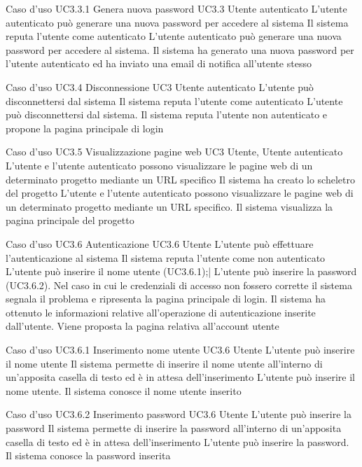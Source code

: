 \UCtitle
{Caso d'uso UC3.3.1}
{Genera nuova password}
\UC
{UC3.3}
{Utente autenticato}
{L'utente autenticato può generare una nuova password per accedere al sistema}
{Il sistema reputa l'utente come autenticato}
\scenario
{L'utente autenticato può generare una nuova password per accedere al sistema.}
\post
{Il sistema ha generato una nuova password per l'utente autenticato ed ha inviato una email di notifica all'utente stesso}

\UCtitle
{Caso d'uso UC3.4}
{Disconnessione}
\UC
{UC3}
{Utente autenticato}
{L'utente può disconnettersi dal sistema}
{Il sistema reputa l'utente come autenticato}
\scenario
{L'utente può disconnettersi dal sistema.}
\post
{Il sistema reputa l'utente non autenticato e propone la pagina principale di login}


\UCtitle
{Caso d'uso UC3.5}
{Visualizzazione pagine web}
\UC
{UC3}
{Utente, Utente autenticato}
{L'utente e l'utente autenticato possono visualizzare le pagine web di un determinato progetto mediante un URL specifico}
{Il sistema ha creato lo scheletro del progetto}
\scenario
{L'utente e l'utente autenticato possono visualizzare le pagine web di un determinato progetto mediante un URL specifico.}
\post
{Il sistema visualizza la pagina principale del progetto}


\UCtitle
{Caso d'uso UC3.6}
{Autenticazione}
\UC
{UC3.6}
{Utente}
{L'utente può effettuare l'autenticazione al sistema}
{Il sistema reputa l'utente come non autenticato}
\scenario
{L'utente può inserire il nome utente (UC3.6.1);|
L'utente può inserire la password (UC3.6.2).
}
\scenarioAlt
{Nel caso in cui le credenziali di accesso non fossero corrette il sistema segnala il problema e ripresenta la pagina principale di login.
}
\post
{Il sistema ha ottenuto le informazioni relative all'operazione di autenticazione inserite dall'utente. Viene proposta la pagina relativa all'account utente}


\UCtitle
{Caso d'uso UC3.6.1}
{Inserimento nome utente}
\UC
{UC3.6}
{Utente}
{L'utente può inserire il nome utente}
{Il sistema permette di inserire il nome utente all'interno di un'apposita casella di testo ed è in attesa dell'inserimento}
\scenario
{L'utente può inserire il nome utente.}
\post
{Il sistema conosce il nome utente inserito}

\UCtitle
{Caso d'uso UC3.6.2}
{Inserimento password}
\UC
{UC3.6}
{Utente}
{L'utente può inserire la password}
{Il sistema permette di inserire la password all'interno di un'apposita casella di testo ed è in attesa dell'inserimento}
\scenario
{L'utente può inserire la password.}
\post
{Il sistema conosce la password inserita}

